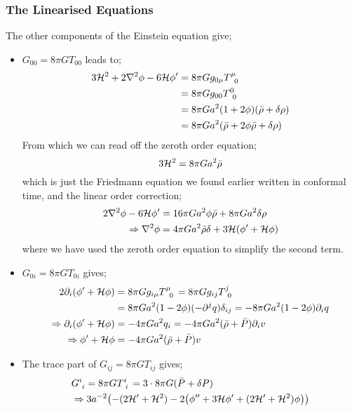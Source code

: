 \subsubsection*{The Linearised Equations}
The other components of the Einstein equation give;
\begin{itemize}
\item $G_{00} = 8\pi G T_{00}$ leads to;
\begin{align*}
3\hamilt^2 + 2\nabla^2 \phi - 6\hamilt \phi\pr &= 8\pi G g_{0\mu} T\indices{^{\mu}_{0}} \\
&= 8\pi G g_{00} T\indices{^{0}_{0}} \\
&= 8\pi Ga^2 (1 + 2\phi)(\bar{\rho} + \delta \rho)\\
&= 8\pi Ga^2(\bar{\rho} + 2\phi \bar{\rho} + \delta \rho)
\end{align*}
From which we can read off the zeroth order equation;
\begin{equation*}
3\mathcal{H}^2 = 8\pi G a^2 \bar{\rho}
\end{equation*}
which is just the Friedmann equation we found earlier written in conformal time, and the linear order correction;
\begin{align*}
2\nabla^2 \phi - 6\mathcal{H} \phi^{\prime} &= 16\pi G a^2 \phi \bar{\rho} + 8\pi Ga^2 \delta \rho \\
\Rightarrow \nabla^2 \phi &= 4\pi G a^2 \bar{\rho} \delta + 3\mathcal{H}(\phi^{\prime} + \mathcal{H} \phi)
\end{align*}
where we have used the zeroth order equation to simplify the second term.
\item $G_{0i} = 8\pi G T_{0i}$ gives;
\begin{align*}
2\del_i(\phi\pr + \hamilt \phi) &= 8\pi G g_{i\mu}T\indices{^{\mu}_{0}} = 8\pi G g_{ij}T\indices{^{j}_{0}} \\
&= 8\pi G a^2 (1 - 2\phi)(-\del^j q)\delta_{ij} = -8\pi G a^2 (1 - 2\phi) \del_i q \\
\Rightarrow \del_i(\phi\pr + \hamilt \phi) &= -4\pi Ga^2 q_i = -4\pi Ga^2 (\bar{\rho} + \bar{P})\del_i v \\
\Rightarrow \phi\pr + \hamilt \phi &= -4\pi G a^2 (\bar{\rho} + \bar{P})v
\end{align*}
\item The trace part of $G_{ij} = 8\pi GT_{ij}$ gives;
\begin{align*}
&G\indices{^{i}_{i}} = 8\pi G T\indices{^{i}_{i}} = 3\cdot8\pi G(\bar{P} + \delta P) \\
&\Rightarrow 3a^{-2}\left(-(2\hamilt\pr + \hamilt^2) - 2\left(\phi^{\prime\prime} + 3\hamilt \phi\pr + (2\hamilt\pr + \hamilt^2)\phi\right)\right) \\

\end{align*}
\end{itemize}
